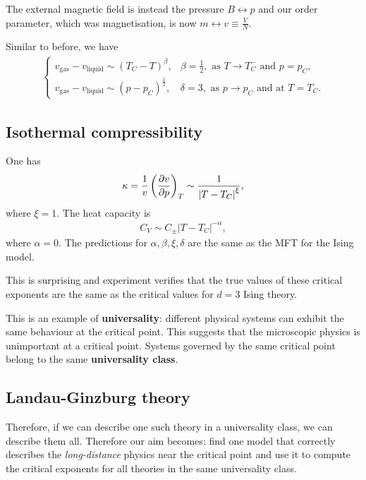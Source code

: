 The external magnetic field is instead the pressure $B \leftrightarrow p$  and our order parameter, which was magnetisation, is now $m \leftrightarrow v \equiv \frac{V}{N}$.

Similar to before, we have
\begin{align}
    \begin{cases}
        v_{\text{gas}} - v_{\text{liquid}} \sim  \left( T_C - T \right)^{\beta}, & \beta = \frac{1}{2}, \text{~as $T \to T_C^{-}$ and $p = p_C$,}\\
        v_{\text{gas}} - v_{\text{liquid}} \sim \left( p - p_C \right)^{\frac{1}{2}}, & \delta = 3, \text{~as $p \to p_C$ and at $T = T_C$.}
    \end{cases}
\end{align}

\subsection{Isothermal compressibility}

One has
\begin{align}
    \kappa = \frac{1}{v} \left( \pdv{v}{p} \right)_{T} \sim \frac{1}{\left| T - T_C \right|^{\xi}} 
,\end{align}
where $\xi = 1$. The heat capacity is
\begin{align}
    C_V \sim  C_{\pm} \left| T - T_C \right|^{-\alpha}
,\end{align}
where $\alpha = 0$. The predictions for $\alpha, \beta, \xi, \delta$ are the same as the MFT for the Ising model.

This is surprising and experiment verifies that the true values of these critical exponents are the same as the critical values for $d = 3$ Ising theory.

This is an example of \textbf{universality}: different physical systems can exhibit the same behaviour at the critical point. This suggests that the microscopic physics is unimportant at a critical point. Systems governed by the same critical point belong to the same \textbf{universality class}.

\subsection{Landau-Ginzburg theory}

Therefore, if we can describe one such theory in a universality class, we can describe them all. Therefore our aim becomes: find one model that correctly describes the \textit{long-distance} physics near the critical point and use it to compute the critical exponents for all theories in the same universality class.

